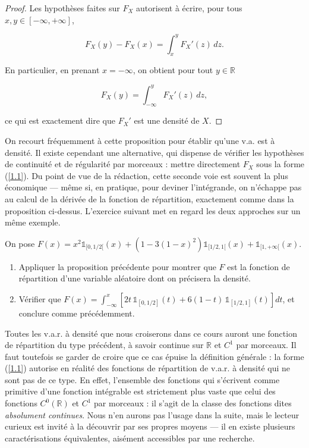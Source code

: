 \begin{proof}
Les hypothèses faites sur $F_X$ autorisent à écrire, pour tous $x, y \in [-\infty, +\infty]$,

$$
F_X(y) - F_X(x) = \int_x^y F_X'(z)\, dz.
$$

En particulier, en prenant $x = -\infty$, on obtient pour tout $y \in \mathbb{R}$

$$
F_X(y) = \int_{-\infty}^y F_X'(z)\, dz,
$$

ce qui est exactement dire que $F_X'$ est une densité de $X$.
\end{proof}

On recourt fréquemment à cette proposition pour établir qu'une v.a. est à densité. Il existe cependant une alternative, qui dispense de vérifier les hypothèses de continuité et de régularité par morceaux : mettre directement $F_X$ sous la forme (\ref{1.1}). Du point de vue de la rédaction, cette seconde voie est souvent la plus économique — même si, en pratique, pour deviner l'intégrande, on n'échappe pas au calcul de la dérivée de la fonction de répartition, exactement comme dans la proposition ci-dessus. L'exercice suivant met en regard les deux approches sur un même exemple.

\begin{exercice}
On pose $F(x) = x^2 \mathbb{1}_{[0, 1/2[}(x) + (1 - 3(1 - x)^2) \mathbb{1}_{[1/2, 1[}(x) + \mathbb{1}_{[1, +\infty[}(x)$.

\begin{enumerate}
\item Appliquer la proposition précédente pour montrer que $F$ est la fonction de répartition d'une variable aléatoire dont on précisera la densité.
\item Vérifier que $F(x) = \int_{-\infty}^x \left[ 2t\, \mathbb{1}_{[0, 1/2]}(t) + 6(1 - t)\, \mathbb{1}_{[1/2, 1]}(t) \right] dt$, et conclure comme précédemment.
\end{enumerate}
\end{exercice}

\newpage

Toutes les v.a.r. à densité que nous croiserons dans ce cours auront une fonction de répartition du type précédent, à savoir continue sur $\mathbb{R}$ et $C^1$ par morceaux. Il faut toutefois se garder de croire que ce cas épuise la définition générale : la forme (\ref{1.1}) autorise en réalité des fonctions de répartition de v.a.r. à densité qui ne sont pas de ce type. En effet, l'ensemble des fonctions qui s'écrivent comme primitive d'une fonction intégrable est strictement plus vaste que celui des fonctions $C^0(\mathbb{R})$ et $C^1$ par morceaux : il s'agit de la classe des fonctions dites \emph{absolument continues}. Nous n'en aurons pas l'usage dans la suite, mais le lecteur curieux est invité à la découvrir par ses propres moyens — il en existe plusieurs caractérisations équivalentes, aisément accessibles par une recherche.

